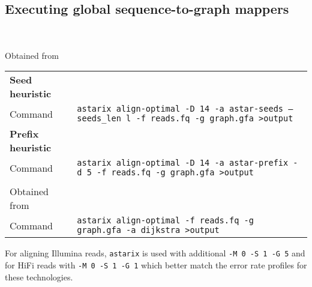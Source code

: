 \subsection{Executing global sequence-to-graph mappers}

\noindent
\begin{tabular}{lp{9.5cm}}
\end{tabular}


 \\
\noindent Obtained from \astarixurl \\
\noindent
\begin{tabular}{lp{9.5cm}}
	\textbf{Seed heuristic} & \\
	\quad Command & \texttt{astarix align-optimal -D 14 -a astar-seeds --seeds\_len l -f reads.fq -g graph.gfa >output} \\
	\textbf{Prefix heuristic} & \\
	\quad Command & \texttt{astarix align-optimal -D 14 -a astar-prefix -d 5 -f reads.fq -g graph.gfa >output} \\
	\textbf{\dijkstra} & \\
	\quad Obtained from & \astarixurlwithbranch \\
	\quad Command & \texttt{astarix align-optimal -f reads.fq -g graph.gfa -a dijkstra >output}
\end{tabular}

For aligning Illumina reads, \texttt{astarix} is used with additional \texttt{-M
0 -S 1 -G 5} and for HiFi reads with \texttt{-M 0 -S 1 -G 1} which better match
the error rate profiles for these technologies.

